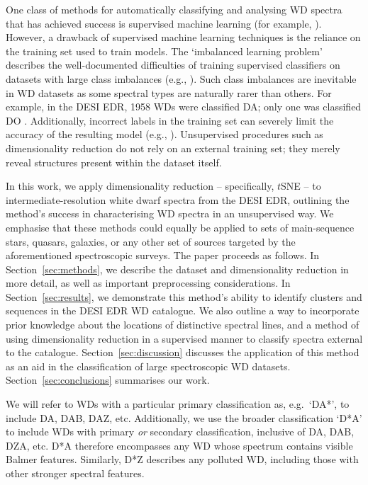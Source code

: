 \documentclass[fleqn,usenatbib]{mnras}
\begin{document}
One class of methods for automatically classifying and analysing WD spectra that has achieved success is supervised machine learning (for example, \citealt{yang20, tan23, garciazamora23, vincent23, vincent24}).
However, a drawback of supervised machine learning techniques is the reliance on the training set used to train models.
The `imbalanced learning problem' describes the well-documented difficulties of training supervised classifiers on datasets with large class imbalances (e.g., \citealt{he09, johnson19}).
Such class imbalances are inevitable in WD datasets as some spectral types are naturally rarer than others.
For example, in the DESI EDR, 1958 WDs were classified DA; only one was classified DO \citep{manser24}.
Additionally, incorrect labels in the training set can severely limit the accuracy of the resulting model (e.g., \citealt{frenay14}).
Unsupervised procedures such as dimensionality reduction do not rely on an external training set; they merely reveal structures present within the dataset itself.

In this work, we apply dimensionality reduction -- specifically, $t$SNE -- to intermediate-resolution white dwarf spectra from the DESI EDR, outlining the method's success in characterising WD spectra in an unsupervised way.
We emphasise that these methods could equally be applied to sets of main-sequence stars, quasars, galaxies, or any other set of sources targeted by the aforementioned spectroscopic surveys.
The paper proceeds as follows.
In Section~\ref{sec:methods}, we describe the dataset and dimensionality reduction in more detail, as well as important preprocessing considerations.
In Section~\ref{sec:results}, we demonstrate this method's ability to identify clusters and sequences in the DESI EDR WD catalogue.
We also outline a way to incorporate prior knowledge about the locations of distinctive spectral lines, and a method of using dimensionality reduction in a supervised manner to classify spectra external to the catalogue.
Section~\ref{sec:discussion} discusses the application of this method as an aid in the classification of large spectroscopic WD datasets.
Section~\ref{sec:conclusions} summarises our work.

We will refer to WDs with a particular primary classification as, e.g.\ `DA*', to include DA, DAB, DAZ, etc.
Additionally, we use the broader classification `D*A' to include WDs with primary \textit{or} secondary classification, inclusive of DA, DAB, DZA, etc.
D*A therefore encompasses any WD whose spectrum contains visible Balmer features.
Similarly, D*Z describes any polluted WD, including those with other stronger spectral features.
\end{document}
